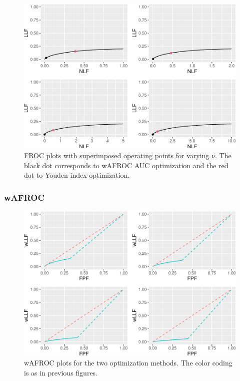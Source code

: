 \documentclass[
]{book}
\begin{document}
\begin{figure}
\centering
\includegraphics{22-optim-op-point_files/figure-latex/optim-op-point-low-performance-vary-lambda-vary-all-froc-1.pdf}
\caption{\label{fig:optim-op-point-low-performance-vary-lambda-vary-all-froc}FROC plots with superimposed operating points for varying \(\nu\). The black dot corresponds to wAFROC AUC optimization and the red dot to Youden-index optimization.}
\end{figure}

\hypertarget{wafroc-8}{%
\subsubsection{wAFROC}\label{wafroc-8}}

\begin{figure}
\centering
\includegraphics{22-optim-op-point_files/figure-latex/optim-op-point-low-performance-vary-lambda-vary-all-wafroc-1.pdf}
\caption{\label{fig:optim-op-point-low-performance-vary-lambda-vary-all-wafroc}wAFROC plots for the two optimization methods. The color coding is as in previous figures.}
\end{figure}
\end{document}
